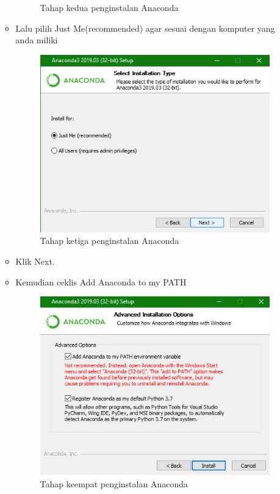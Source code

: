 \begin{enumerate}
\begin{itemize}
\begin{figure}[!htbp]
\caption{Tahap kedua penginstalan Anaconda}
\end{figure}
\item Lalu pilih Just Me(recommended) agar sesuai dengan komputer yang anda miliki
\begin{figure}[!htbp]
\centering
\includegraphics[scale=0.7]{figures/C3.png}
\caption{Tahap ketiga penginstalan Anaconda}
\end{figure}
\item Klik Next.
\item Kemudian ceklis Add Anaconda to my PATH
\begin{figure}[!htbp]
\centering
\includegraphics[scale=0.7]{figures/C4.png}
\caption{Tahap keempat penginstalan Anaconda}

\end{figure}
\end{itemize}
\end{enumerate}
